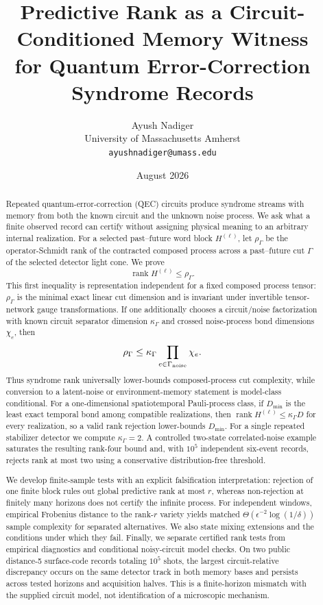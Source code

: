 \documentclass[11pt]{article}
\title{Predictive Rank as a Circuit-Conditioned Memory Witness\\for Quantum Error-Correction Syndrome Records}
\author{Ayush Nadiger\\University of Massachusetts Amherst\\\texttt{ayushnadiger@umass.edu}}
\date{August 2026}
\newcommand{\rank}{\operatorname{rank}}
\begin{document}
\maketitle

\begin{abstract}
Repeated quantum-error-correction (QEC) circuits produce syndrome streams with memory from both the known circuit and the unknown noise process. We ask what a finite observed record can certify without assigning physical meaning to an arbitrary internal realization. For a selected past--future word block $H^{(\ell)}$, let $\rho_\Gamma$ be the operator-Schmidt rank of the contracted composed process across a past--future cut $\Gamma$ of the selected detector light cone. We prove
\[
\rank H^{(\ell)}\le \rho_\Gamma.
\]
This first inequality is representation independent for a fixed composed process tensor: $\rho_\Gamma$ is the minimal exact linear cut dimension and is invariant under invertible tensor-network gauge transformations. If one additionally chooses a circuit/noise factorization with known circuit separator dimension $\kappa_\Gamma$ and crossed noise-process bond dimensions $\chi_e$, then
\[
\rho_\Gamma\le \kappa_\Gamma\prod_{e\in\Gamma_{\rm noise}}\chi_e.
\]
Thus syndrome rank universally lower-bounds composed-process cut complexity, while conversion to a latent-noise or environment-memory statement is model-class conditional. For a one-dimensional spatiotemporal Pauli-process class, if $D_{\min}$ is the least exact temporal bond among compatible realizations, then $\rank H^{(\ell)}\le\kappa_\Gamma D$ for every realization, so a valid rank rejection lower-bounds $D_{\min}$. For a single repeated stabilizer detector we compute $\kappa_\Gamma=2$. A controlled two-state correlated-noise example saturates the resulting rank-four bound and, with $10^5$ independent six-event records, rejects rank at most two using a conservative distribution-free threshold.

We develop finite-sample tests with an explicit falsification interpretation: rejection of one finite block rules out global predictive rank at most $r$, whereas non-rejection at finitely many horizons does not certify the infinite process. For independent windows, empirical Frobenius distance to the rank-$r$ variety yields matched $\Theta(\epsilon^{-2}\log(1/\delta))$ sample complexity for separated alternatives. We also state mixing extensions and the conditions under which they fail. Finally, we separate certified rank tests from empirical diagnostics and conditional noisy-circuit model checks. On two public distance-5 surface-code records totaling $10^5$ shots, the largest circuit-relative discrepancy occurs on the same detector track in both memory bases and persists across tested horizons and acquisition halves. This is a finite-horizon mismatch with the supplied circuit model, not identification of a microscopic mechanism.
\end{abstract}
\end{document}
